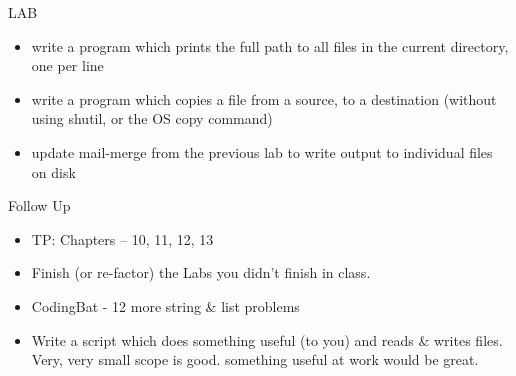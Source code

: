 \documentclass{beamer}
\begin{document}
\begin{frame}{LAB}

\begin{itemize}
  \item write a program which prints the full path to all files in the current
        directory, one per line
  \item write a program which copies a file from a source, to a
        destination (without using shutil, or the OS copy command)
   \item update mail-merge from the previous lab to write output
         to individual files on disk
\end{itemize}

\end{frame}

\begin{frame}{Follow Up}

\begin{itemize}
  \item TP: Chapters -- 10, 11, 12, 13
  \item Finish (or re-factor) the Labs you didn't finish in class.
  \item CodingBat - 12 more string \& list problems
  \item Write a script which does something useful (to you) and reads \& writes
        files. Very, very small scope is good. something useful at work would
        be great.
\end{itemize}

\end{frame}
\end{document}
